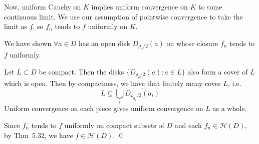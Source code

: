 \documentclass[a4paper]{article}
\newcommand{\Hol}{\mathcal{H}}
\begin{document}
\medskip
Now, uniform Cauchy on $K$ implies uniform convergence on $K$ to some continuous limit. We use our assumption of pointwise convergence to take the limit as $f$, so $f_n$ tends to $f$ uniformly on $K$.

We have shown $\forall a \in D$ has an open disk $D_{\rho_a/2}(a)$ on whose closure $f_n$ tends to $f$ uniformly. 

\medskip
Let $L \subset D$ be compact. Then the disks $\{D_{\rho_a/2}(a) : a \in L\}$ also form
a cover of $L$ which is open. Then by compactness, we have that finitely many cover $L$, i.e.
\[
L \subseteq \bigcup_i \overline{D_{\rho_{a_i}/2}(a_i)}
\]
Uniform convergence on each piece gives uniform convergence on $L$ as a whole.

\medskip
Since $f_n$ tends to $f$ uniformly on compact subsets of $D$ and each $f_n \in \Hol(D)$, by
Thm~5.32, we have $f \in \Hol(D)$. \qed
\end{document}
